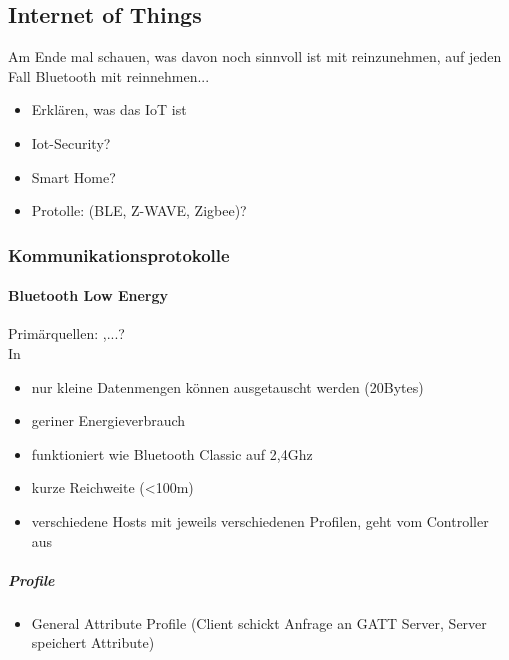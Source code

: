 \subsection{Internet of Things}
\label{sec:sota_iot}
    Am Ende mal schauen, was davon noch sinnvoll ist mit reinzunehmen, auf jeden Fall Bluetooth mit reinnehmen... 
    \begin{itemize}
        \item Erklären, was das IoT ist
        \item Iot-Security?
        \item Smart Home?
        \item Protolle: (BLE, Z-WAVE, Zigbee)?
    \end{itemize}


\subsubsection{Kommunikationsprotokolle}
\label{sec:sota_iot_protocols}
    
    \paragraph{Bluetooth Low Energy}

    Primärquellen: \cite{Gomez2012},...?\\
    
    In \cite{Rose2016}
    \begin{itemize}
        \item nur kleine Datenmengen können ausgetauscht werden (20Bytes)\cite{Rose2016}
        \item geriner Energieverbrauch
        \item funktioniert wie Bluetooth Classic auf 2,4Ghz
        \item kurze Reichweite (<100m)
        \item verschiedene Hosts mit jeweils verschiedenen Profilen, geht vom Controller aus
    \end{itemize}
    
    \subparagraph{Profile}\cite{Rose2016}
        \begin{itemize}
            \item General Attribute Profile (Client schickt Anfrage an GATT Server, Server speichert Attribute)
        \end{itemize}
